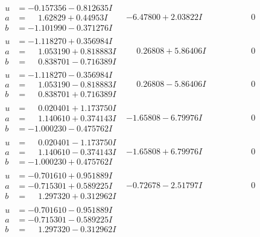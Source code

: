 \documentclass[1p]{elsarticle_modified}
\theoremstyle{definition}
\begin{document}
$$\begin{array}{c|c|c}
\begin{aligned}
u &= -0.157356 - 0.812635 I \\
a &= \phantom{-}1.62829 + 0.44953 I \\
b &= -1.101990 - 0.371276 I\end{aligned}
 & -6.47800 + 2.03822 I & \phantom{-0.000000 } 0 \\ \hline\begin{aligned}
u &= -1.118270 + 0.356984 I \\
a &= \phantom{-}1.053190 + 0.818883 I \\
b &= \phantom{-}0.838701 - 0.716389 I\end{aligned}
 & \phantom{-}0.26808 + 5.86406 I & \phantom{-0.000000 } 0 \\ \hline\begin{aligned}
u &= -1.118270 - 0.356984 I \\
a &= \phantom{-}1.053190 - 0.818883 I \\
b &= \phantom{-}0.838701 + 0.716389 I\end{aligned}
 & \phantom{-}0.26808 - 5.86406 I & \phantom{-0.000000 } 0 \\ \hline\begin{aligned}
u &= \phantom{-}0.020401 + 1.173750 I \\
a &= \phantom{-}1.140610 + 0.374143 I \\
b &= -1.000230 - 0.475762 I\end{aligned}
 & -1.65808 - 6.79976 I & \phantom{-0.000000 } 0 \\ \hline\begin{aligned}
u &= \phantom{-}0.020401 - 1.173750 I \\
a &= \phantom{-}1.140610 - 0.374143 I \\
b &= -1.000230 + 0.475762 I\end{aligned}
 & -1.65808 + 6.79976 I & \phantom{-0.000000 } 0 \\ \hline\begin{aligned}
u &= -0.701610 + 0.951889 I \\
a &= -0.715301 + 0.589225 I \\
b &= \phantom{-}1.297320 + 0.312962 I\end{aligned}
 & -0.72678 - 2.51797 I & \phantom{-0.000000 } 0 \\ \hline\begin{aligned}
u &= -0.701610 - 0.951889 I \\
a &= -0.715301 - 0.589225 I \\
b &= \phantom{-}1.297320 - 0.312962 I\end{aligned}

\end{array}$$
\end{document}
